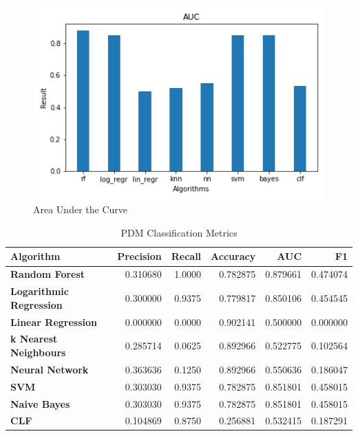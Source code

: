 \documentclass[a4paper,12pt]{report}
\begin{document}
\begin{figure}[H]
    \includegraphics[scale=0.9]{AUC.png}
    \centering
    \caption{Area Under the Curve}
    \label{fig:AUC}
\end{figure}

\begin{table}[h]
    \caption{PDM Classification Metrics}
    \label{table:Metrics}
    \begin{tabular}{lrrrrr}
        \toprule
            \textbf{Algorithm} &  \textbf{Precision} &  \textbf{Recall} &  \textbf{Accuracy} &       \textbf{AUC} &        \textbf{F1} \\
        \midrule
        \textbf{Random Forest} &   0.310680 &  \cellcolor{lightgray} 1.0000 &  0.782875 &  \cellcolor{lightgray}0.879661 &  \cellcolor{lightgray}0.474074 \\
        \textbf{Logarithmic Regression} &   0.300000 &  0.9375 &  0.779817 &  0.850106 &  0.454545 \\
        \textbf{Linear Regression} &   0.000000 &  0.0000 &  \cellcolor{lightgray}0.902141 &  0.500000 &  0.000000 \\
        \textbf{k Nearest Neighbours} &   0.285714 &  0.0625 &  0.892966 &  0.522775 &  0.102564 \\
        \textbf{Neural Network} &   \cellcolor{lightgray}0.363636 &  0.1250 &  0.892966 &  0.550636 &  0.186047 \\
        \textbf{SVM} &   0.303030 &  0.9375 &  0.782875 &  0.851801 &  0.458015 \\
        \textbf{Naive Bayes} &   0.303030 &  0.9375 &  0.782875 &  0.851801 &  0.458015 \\
        \textbf{CLF} &   0.104869 &  0.8750 &  0.256881 &  0.532415 &  0.187291 \\
        \bottomrule
    \end{tabular}
\end{table}
\end{document}
